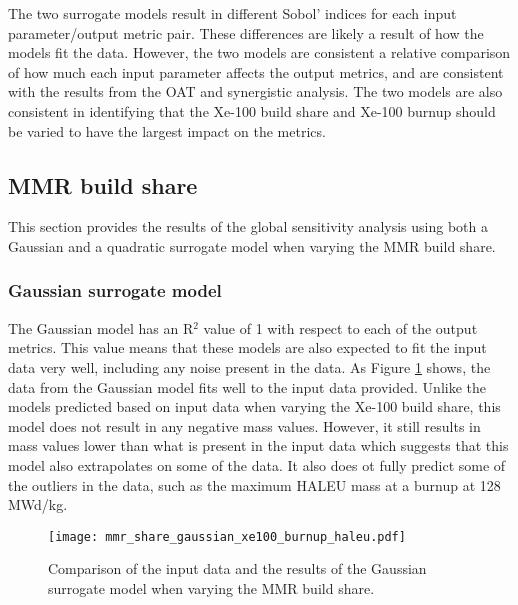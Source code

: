 The two surrogate models result in different Sobol' indices for each 
input parameter/output metric pair. These differences are likely a result 
of how the models fit the data. However, the two models are consistent 
a relative comparison of how much each input parameter affects the output 
metrics, and are consistent with the results from the \gls{OAT} and 
synergistic analysis. The two models are also consistent in 
identifying that the Xe-100 build share and Xe-100 burnup 
should be varied to have the largest impact on the metrics.

\subsection{MMR build share}
This section provides the results of the global sensitivity analysis using 
both a Gaussian and a quadratic surrogate model when varying the \gls{MMR} 
build share. 

\subsubsection{Gaussian surrogate model}
The Gaussian model has an R$^2$ value of 1 with respect to each of the output 
metrics. This value means that these models are also expected to fit the input 
data very well, including any noise present in the data. As Figure 
\ref{fig:s7_mmr_gaussian} shows, the data from the Gaussian model fits well 
to the input data provided. Unlike the models predicted based on input data when 
varying the Xe-100 build share, this model does not result in any negative 
mass values. However, it still results in mass values lower than what is 
present in the input data which suggests that this model also extrapolates 
on some of the data. It also does ot fully predict some of the outliers in 
the data, such as the maximum \gls{HALEU} mass at a burnup at 128 MWd/kg.

\begin{figure}
    \centering 
    \texttt{[image: mmr\_share\_gaussian\_xe100\_burnup\_haleu.pdf]}
    \caption{Comparison of the input data and the results of the Gaussian 
    surrogate model when varying the MMR build share.}
    \label{fig:s7_mmr_gaussian}
\end{figure}

